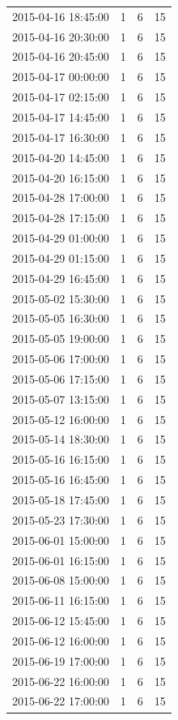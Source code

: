 \begin{tabular}{lrrr}
2015-04-16 18:45:00 & 1 & 6 & 15 \\
2015-04-16 20:30:00 & 1 & 6 & 15 \\
2015-04-16 20:45:00 & 1 & 6 & 15 \\
2015-04-17 00:00:00 & 1 & 6 & 15 \\
2015-04-17 02:15:00 & 1 & 6 & 15 \\
2015-04-17 14:45:00 & 1 & 6 & 15 \\
2015-04-17 16:30:00 & 1 & 6 & 15 \\
2015-04-20 14:45:00 & 1 & 6 & 15 \\
2015-04-20 16:15:00 & 1 & 6 & 15 \\
2015-04-28 17:00:00 & 1 & 6 & 15 \\
2015-04-28 17:15:00 & 1 & 6 & 15 \\
2015-04-29 01:00:00 & 1 & 6 & 15 \\
2015-04-29 01:15:00 & 1 & 6 & 15 \\
2015-04-29 16:45:00 & 1 & 6 & 15 \\
2015-05-02 15:30:00 & 1 & 6 & 15 \\
2015-05-05 16:30:00 & 1 & 6 & 15 \\
2015-05-05 19:00:00 & 1 & 6 & 15 \\
2015-05-06 17:00:00 & 1 & 6 & 15 \\
2015-05-06 17:15:00 & 1 & 6 & 15 \\
2015-05-07 13:15:00 & 1 & 6 & 15 \\
2015-05-12 16:00:00 & 1 & 6 & 15 \\
2015-05-14 18:30:00 & 1 & 6 & 15 \\
2015-05-16 16:15:00 & 1 & 6 & 15 \\
2015-05-16 16:45:00 & 1 & 6 & 15 \\
2015-05-18 17:45:00 & 1 & 6 & 15 \\
2015-05-23 17:30:00 & 1 & 6 & 15 \\
2015-06-01 15:00:00 & 1 & 6 & 15 \\
2015-06-01 16:15:00 & 1 & 6 & 15 \\
2015-06-08 15:00:00 & 1 & 6 & 15 \\
2015-06-11 16:15:00 & 1 & 6 & 15 \\
2015-06-12 15:45:00 & 1 & 6 & 15 \\
2015-06-12 16:00:00 & 1 & 6 & 15 \\
2015-06-19 17:00:00 & 1 & 6 & 15 \\
2015-06-22 16:00:00 & 1 & 6 & 15 \\
2015-06-22 17:00:00 & 1 & 6 & 15 \\

\end{tabular}
